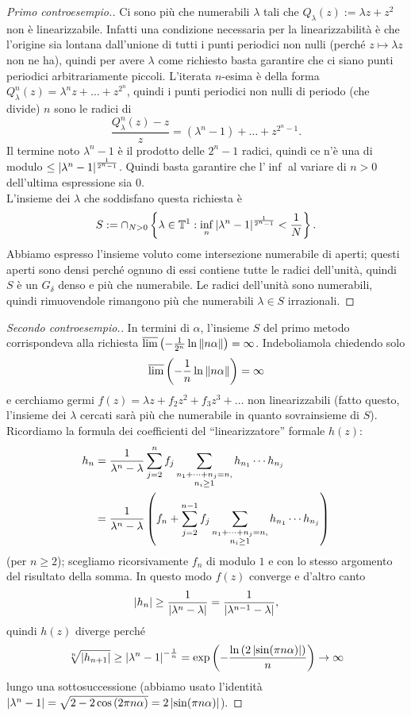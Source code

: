 \begin{proof}[Primo controesempio.]
Ci sono più che numerabili $\lambda$ tali che $Q_\lambda(z):=\lambda z+z^2$ non è linearizzabile.
Infatti una condizione necessaria per la linearizzabilità è che l'origine sia lontana dall'unione di tutti
i punti periodici non nulli (perché $z\mapsto \lambda z$ non ne ha), quindi per avere $\lambda$ come richiesto basta garantire che ci siano punti periodici arbitrariamente piccoli. L'iterata $n$-esima è della forma $Q_\lambda^n(z)=\lambda^n z+\dots+z^{2^n}$, quindi i punti periodici non nulli di periodo (che divide) $n$ sono le radici di
\[ \frac{Q_\lambda^n(z)-z}{z}=(\lambda^n-1)+\dots+z^{2^n-1}. \]
Il termine noto $\lambda^n-1$ è il prodotto delle $2^n-1$ radici, quindi ce n'è una di modulo $\le\left|\lambda^n-1\right|^{\frac{1}{2^n-1}}$.
Quindi basta garantire che l'$\inf$ al variare di $n>0$ dell'ultima espressione sia $0$. \\
L'insieme dei $\lambda$ che soddisfano questa richiesta è
\[ S:=\cap_{N>0}\left\{\lambda\in\mathbb{T}^1:\inf_n\left|\lambda^n-1\right|^{\frac{1}{2^n-1}}<\frac{1}{N}\right\}. \]
Abbiamo espresso l'insieme voluto come intersezione numerabile di aperti; questi aperti sono densi perché ognuno di essi contiene tutte le radici dell'unità, quindi $S$ è un $G_\delta$ denso e più che numerabile. Le radici dell'unità sono numerabili, quindi rimuovendole rimangono più che numerabili $\lambda\in S$ irrazionali.
\end{proof} 

\begin{proof}[Secondo controesempio.]
In termini di $\alpha$, l'insieme $S$ del primo metodo corrispondeva alla richiesta
$\overline{\lim}\left(-\frac{1}{2^n}\ln\left\|n\alpha\right\|\right)=\infty$. Indeboliamola chiedendo solo
\[ \overline{\lim}\left(-\frac{1}{n}\ln\left\|n\alpha\right\|\right)=\infty \]
e cerchiamo germi $f(z)=\lambda z+f_2 z^2+f_3 z^3+\dots$ non linearizzabili (fatto questo, l'insieme dei $\lambda$ cercati
sarà più che numerabile in quanto sovrainsieme di $S$).
Ricordiamo la formula dei coefficienti del ``linearizzatore'' formale $h(z)$:
\[ \begin{split} h_n&=\frac{1}{\lambda^n-\lambda}\sum_{j=2}^n f_j\sum_{\substack{n_1+\dots+n_j=n,\\n_i\ge 1}}h_{n_1}\cdots h_{n_j} \\
&=\frac{1}{\lambda^n-\lambda}\left(f_n+\sum_{j=2}^{n-1}f_j\sum_{\substack{n_1+\dots+n_j=n,\\n_i\ge 1}}h_{n_1}\cdots h_{n_j}\right) \end{split} \]
(per $n\ge 2$); scegliamo ricorsivamente $f_n$ di modulo $1$ e con lo stesso argomento del risultato della somma.
In questo modo $f(z)$ converge e d'altro canto
\[ \left|h_n\right|\ge\frac{1}{\left|\lambda^n-\lambda\right|}=\frac{1}{\left|\lambda^{n-1}-\lambda\right|}, \]
quindi $h(z)$ diverge perché
\[ \sqrt[n]{\left|h_{n+1}\right|}\ge\left|\lambda^n-1\right|^{-\frac{1}{n}}=\exp\left(-\frac{\ln\left(2\left|\sin(\pi n\alpha)\right|\right)}{n}\right)\to\infty \]
lungo una sottosuccessione (abbiamo usato l'identità $\left|\lambda^n-1\right|=\sqrt{2-2\cos\left(2\pi n\alpha\right)}=2\left|\sin(\pi n\alpha)\right|$).
\end{proof}

